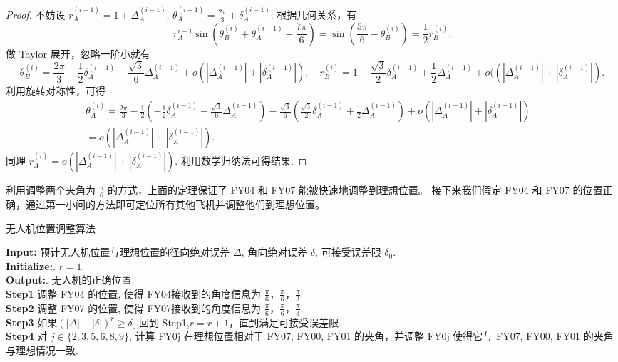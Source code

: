 \documentclass{my_paper}
\begin{document}
\begin{proof}
    不妨设 $r_A^{(i-1)}=1+\Delta_A^{(i-1)}$, $\theta_A^{(i-1)}=\frac{2\pi}{3}+\delta_A^{(i-1)}$. 根据几何关系，有 
    $$
    r_A^{i-1}\sin(\theta_B^{(i)}+\theta_A^{(i-1)}-\frac{7\pi}{6})=\sin(\frac{5\pi}{6}-\theta_{B}^{(i)})=\frac12 r_B^{(i)}.
    $$
    做 Taylor 展开，忽略一阶小就有
    $$
        \theta_{B}^{(i)}= \frac{2\pi}3-\frac{1}{2} \delta_A^{(i-1)}-\frac{\sqrt 3}6 \Delta_A^{(i-1)}+o(|\Delta_A^{(i-1)}|+|\delta_A^{(i-1)}|)
        ,\quad r_{B}^{(i)} = 1 +\frac{\sqrt3}{2} \delta_A^{(i-1)}+\frac12 \Delta_A^{(i-1)}+o((|\Delta_A^{(i-1)}|+|\delta_A^{(i-1)}|).
    $$
    利用旋转对称性，可得
    \begin{equation}
    \begin{aligned}
        \theta_{A}^{(i)}= \frac{2\pi}3-\frac{1}{2} (-\frac{1}{2} \delta_A^{(i-1)}-\frac{\sqrt 3}6 \Delta_A^{(i-1)})
        -\frac{\sqrt 3}6 (\frac{\sqrt3}{2} \delta_A^{(i-1)}+\frac12 \Delta_A^{(i-1)}) +o(|\Delta_A^{(i-1)}|+|\delta_A^{(i-1)}|)
        \\=o(|\Delta_A^{(i-1)}|+|\delta_A^{(i-1)}|).&
    \end{aligned}
    \label{2}
    \end{equation}
    同理 $r_{A}^{(i)}=o(|\Delta_A^{(i-1)}|+|\delta_A^{(i-1)}|).$ 利用数学归纳法可得结果. 
\end{proof}

    利用调整两个夹角为 $\frac\pi6$ 的方式，上面的定理保证了 FY04 和 FY07 能被快速地调整到理想位置。
    接下来我们假定 FY04 和 FY07 的位置正确，通过第一小问的方法即可定位所有其他飞机并调整他们到理想位置。

\begin{algorithm}[H]
    \caption{\small 无人机位置调整算法}
    \textbf{Input:} 预计无人机位置与理想位置的径向绝对误差 $\Delta$, 角向绝对误差 $\delta$, 可接受误差限 $\delta_0$.\\
    \textbf{Initialize:}. $r=1$.\\
    \textbf{Output:}. 无人机的正确位置.\\
    \textbf{Step1} 调整 FY04 的位置, 使得 FY04接收到的角度信息为 $\frac{\pi}{6}$，$\frac{\pi}{6}$，$\frac{\pi}{3}$.\\
    \textbf{Step2} 调整 FY07 的位置, 使得 FY07接收到的角度信息为 $\frac{\pi}{6}$，$\frac{\pi}{6}$，$\frac{\pi}{3}$.\\
    \textbf{Step3} 如果$(|\Delta|+|\delta|)^r\geq\delta_0$,回到 Step1,$r=r+1$，直到满足可接受误差限.\\
    \textbf{Step4} 对 $j\in\{2,3,5,6,8,9\}$, 计算 FY0j 在理想位置相对于 FY07, FY00, FY01 的夹角，并调整 FY0j 使得它与 FY07, FY00, FY01 的夹角与理想情况一致.\\
\end{algorithm}
\end{document}
